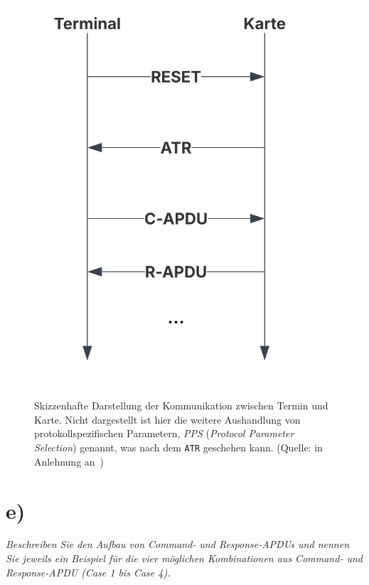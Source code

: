 \begin{figure}
    \centering
    \includegraphics[scale=0.4]{aufgabe 1/img/apdu.svg}
    \caption{Skizzenhafte Darstellung der Kommunikation zwischen Termin und Karte. Nicht dargestellt ist hier die weitere Aushandlung von protokollspezifischen Parametern, \textit{PPS} (\textit{Protocol Parameter Selection}) genannt, was nach dem \texttt{ATR} geschehen kann. (Quelle: in Anlehnung an~\cite[\textbf{Bild 6.1}, 378]{RE02})}
    \label{fig:apdu}
\end{figure}


\section{e)}

\textit{Beschreiben Sie den Aufbau von Command‐ und Response‐APDUs und nennen
Sie jeweils ein Beispiel für die vier möglichen Kombinationen aus Command‐
und Response‐APDU (Case 1 bis Case 4).}\\



